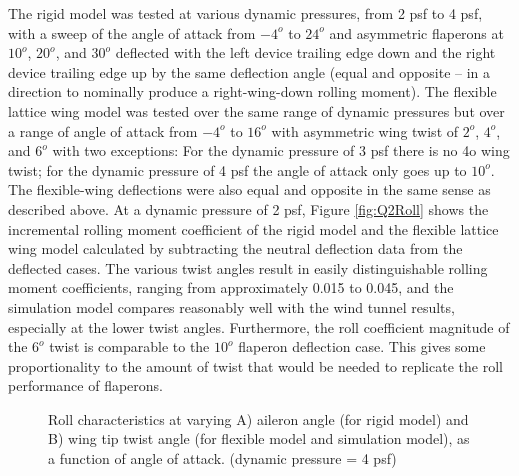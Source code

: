 \documentclass[11pt]{ucthesis}
\begin{document}
The rigid model was tested at various dynamic pressures, from 2 psf to 4 psf, with a sweep of the angle of attack from $−4^o$ to $24^o$ and asymmetric flaperons at $10^o$, $20^o$, and $30^o$ deflected with the left device trailing edge down and the right device trailing edge up by the same deflection angle (equal and opposite – in a direction to nominally produce a right-wing-down rolling moment).  The flexible lattice wing model was tested over the same range of dynamic pressures but over a range of angle of attack from $−4^o$ to $16^o$ with asymmetric wing twist of $2^o$, $4^o$, and $6^o$ with two exceptions:  For the dynamic pressure of 3 psf there is no 4o wing twist; for the dynamic pressure of 4 psf the angle of attack only goes up to $10^o$.  The flexible-wing deflections were also equal and opposite in the same sense as described above.  At a dynamic pressure of 2 psf, Figure \ref{fig:Q2Roll} shows the incremental rolling moment coefficient of the rigid model and the flexible lattice wing model calculated by subtracting the neutral deflection data from the deflected cases. The various twist angles result in easily distinguishable rolling moment coefficients, ranging from approximately 0.015 to 0.045, and the simulation model compares reasonably well with the wind tunnel results, especially at the lower twist angles. Furthermore, the roll coefficient magnitude of the $6^o$ twist is comparable to the $10^o$ flaperon deflection case. This gives some proportionality to the amount of twist that would be needed to replicate the roll performance of flaperons.

\begin{figure}
\hfill
{}
\hfill
{}
\hfill
\caption{Roll characteristics at varying A) aileron angle (for rigid model) and B) wing tip twist angle (for flexible model and simulation model), as a function of angle of attack. (dynamic pressure = 4 psf)}
\label{fig:Q4Roll}
\end{figure}
\end{document}

